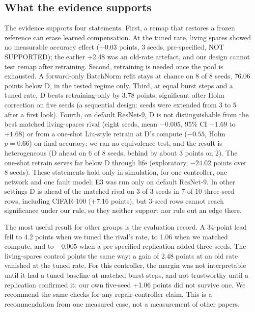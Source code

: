 \documentclass[journal]{IEEEtran}
\begin{document}
\subsection{What the evidence supports}
The evidence supports four statements.
First, a remap that restores a frozen reference can erase learned compensation.
At the tuned rate, living spares showed no measurable accuracy effect (+0.03 points, 3 seeds, pre-specified, NOT SUPPORTED); the earlier +2.48 was an old-rate artefact, and our design cannot test remap after retraining.
Second, retraining is needed once the pool is exhausted.
A forward-only BatchNorm refit stays at chance on 8 of 8 seeds, 76.06 points below D, in the tested regime only.
Third, at equal burst steps and a tuned rate, D beats retraining-only by 3.78 points, significant after Holm correction on five seeds (a sequential design: seeds were extended from 3 to 5 after a first look).
Fourth, on default ResNet-9, D is not distinguishable from the best matched living-spares rival (eight seeds, mean $-0.005$, 95\% CI $-1.69$ to $+1.68$) or from a one-shot Liu-style retrain at D's compute ($-0.55$, Holm $p=0.66$) on final accuracy; we ran no equivalence test, and the result is heterogeneous (D ahead on 6 of 8 seeds, behind by about 3 points on 2).
The one-shot retrain serves far below D through life (exploratory, $-24.02$ points over 8 seeds).
These statements hold only in simulation, for one controller, one network and one fault model; E3 was run only on default ResNet-9.
In other settings D is ahead of the matched rival on 3 of 3 seeds in 7 of 10 three-seed rows, including CIFAR-100 (+7.16 points), but 3-seed rows cannot reach significance under our rule, so they neither support nor rule out an edge there.

The most useful result for other groups is the evaluation record.
A 34-point lead fell to 4.2 points when we tuned the rival's rate, to 1.06 when we matched compute, and to $-0.005$ when a pre-specified replication added three seeds.
The living-spares control points the same way: a gain of 2.48 points at an old rate vanished at the tuned rate.
For this controller, the margin was not interpretable until it had a tuned baseline at matched burst steps, and not trustworthy until a replication confirmed it: our own five-seed +1.06 points did not survive one.
We recommend the same checks for any repair-controller claim.
This is a recommendation from one measured case, not a measurement of other papers.
\end{document}
